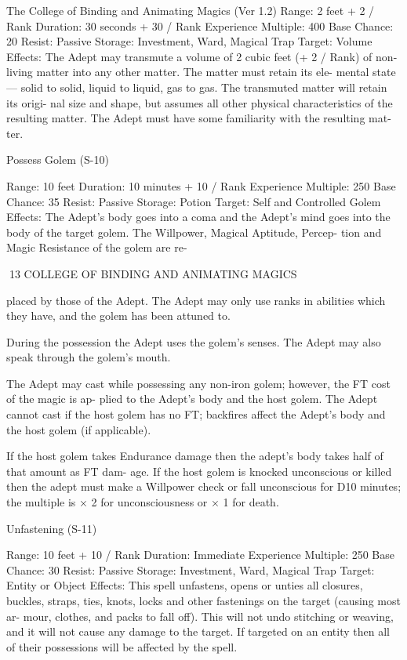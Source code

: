 \begin{Chapter}{The College of Binding and Animating Magics (Ver 1.2)}
Range: 2 feet + 2 / Rank 
Duration: 30 seconds + 30 / Rank 
Experience Multiple: 400 
Base Chance: 20%
Resist: Passive 
Storage: Investment, Ward, Magical Trap 
Target: Volume 
Effects:  The  Adept  may  transmute  a  volume  of  2 
cubic  feet  (+  2  /  Rank)  of  non-living  matter  into 
any  other  matter.  The  matter  must  retain  its  ele-
mental  state  —  solid  to  solid,  liquid to  liquid,  gas 
to  gas.  The  transmuted  matter  will  retain its  origi-
nal  size  and  shape,  but  assumes  all  other  physical 
characteristics  of  the  resulting  matter.  The  Adept 
must have some familiarity with the resulting mat-
ter. 

Possess Golem (S-10) 

Range: 10 feet 
Duration: 10 minutes + 10 / Rank 
Experience Multiple: 250 
Base Chance: 35%
Resist: Passive 
Storage: Potion 
Target: Self and Controlled Golem 
Effects:  The  Adept’s  body  goes  into  a  coma  and 
the  Adept’s  mind  goes  into  the  body  of  the  target 
golem.  The  Willpower,  Magical  Aptitude,  Percep-
tion  and  Magic  Resistance  of  the  golem  are  re-

13 COLLEGE OF BINDING AND ANIMATING MAGICS 

placed by those of the Adept. The Adept may only 
use  ranks  in  abilities  which  they  have,  and  the 
golem has been attuned to. 

During  the  possession  the  Adept  uses  the  golem’s 
senses.  The  Adept  may  also  speak  through  the 
golem’s mouth. 

The Adept may cast while possessing any non-iron 
golem;  however,  the  FT  cost  of  the  magic  is  ap-
plied to the Adept’s body and the host golem. The 
Adept  cannot  cast  if  the  host  golem  has  no  FT; 
backfires  affect  the  Adept’s  body  and  the  host 
golem (if applicable). 

If the host golem takes Endurance damage then the 
adept’s body takes half of that amount as FT dam-
age.  If  the  host  golem  is  knocked  unconscious  or 
killed then the adept must make a Willpower check 
or fall unconscious for D10 minutes; the multiple is 
× 2 for unconsciousness or × 1 for death. 

Unfastening (S-11) 

Range: 10 feet + 10 / Rank 
Duration: Immediate 
Experience Multiple: 250 
Base Chance: 30%
Resist: Passive 
Storage: Investment, Ward, Magical Trap 
Target: Entity or Object 
Effects:  This  spell  unfastens,  opens  or  unties  all 
closures,  buckles,  straps,  ties,  knots,  locks  and 
other  fastenings  on  the  target  (causing  most  ar-
mour, clothes, and packs to fall off). This  will not 
undo stitching or weaving, and it will not cause any 
damage  to  the  target.  If  targeted  on  an  entity  then 
all of their possessions will be affected by the spell. 


\end{Chapter}
